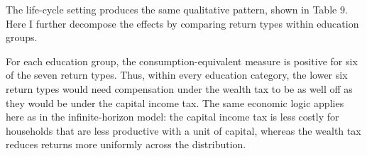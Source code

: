 \par The life-cycle setting produces the same qualitative pattern, shown in Table 9. Here I further decompose the effects by comparing return types within education groups.



\par For each education group, the consumption-equivalent measure is positive for six of the seven return types. Thus, within every education category, the lower six return types would need compensation under the wealth tax to be as well off as they would be under the capital income tax. The same economic logic applies here as in the infinite-horizon model: the capital income tax is less costly for households that are less productive with a unit of capital, whereas the wealth tax reduces returns more uniformly across the distribution.
